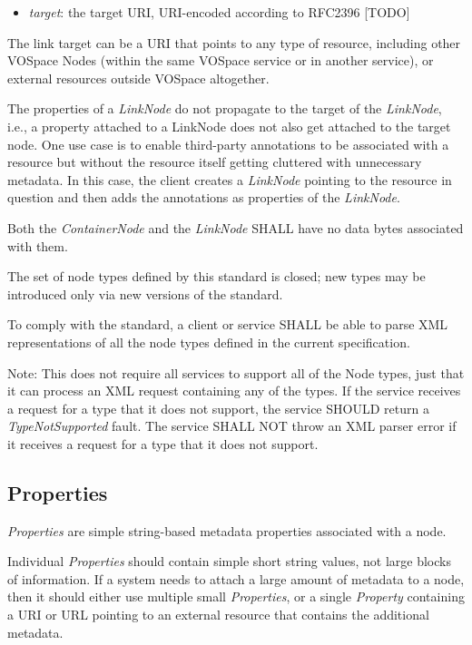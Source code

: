 \documentclass[11pt,a4paper]{ivoa}
\begin{document}
\begin{itemize}
    \item \emph{target}: the target URI, URI-encoded according to RFC2396 [TODO]
\end{itemize}

The link target can be a URI that points to any type of resource, including other VOSpace Nodes (within the same VOSpace service or in another service), or external resources outside VOSpace altogether.

The properties of a \emph{LinkNode} do not propagate to the target of the \emph{LinkNode}, i.e., a property attached to a LinkNode does not also get attached to the target node. One use case is to enable third-party annotations to be associated with a resource but without the resource itself getting cluttered with unnecessary metadata. In this case, the client creates a \emph{LinkNode} pointing to the resource in question and then adds the annotations as properties of the \emph{LinkNode}.

Both the \emph{ContainerNode} and the \emph{LinkNode} SHALL have no data bytes associated with them.

The set of node types defined by this standard is closed; new types may be introduced only via new versions of the standard.

To comply with the standard, a client or service SHALL be able to parse XML representations of all the node types defined in the current specification.

Note: This does not require all services to support all of the Node types, just that it can process an XML request containing any of the types. If the service receives a request for a type that it does not support, the service SHOULD return a \emph{TypeNotSupported} fault. The service SHALL NOT throw an XML parser error if it receives a request for a type that it does not support.

\subsection{Properties}
\emph{Properties} are simple string-based metadata properties associated with a node.

Individual \emph{Properties} should contain simple short string values, not large blocks of information. If a system needs to attach a large amount of metadata to a node, then it should either use multiple small \emph{Properties}, or a single \emph{Property} containing a URI or URL pointing to an external resource that contains the additional metadata.
\end{document}
